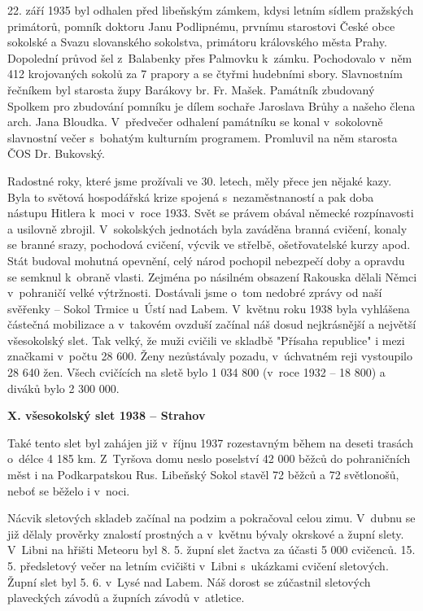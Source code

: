 \documentclass[a5paper, 12pt, twoside]{article}
\begin{document}
22. září 1935 byl odhalen před libeňským zámkem, kdysi letním sídlem
pražských primátorů, pomník doktoru Janu Podlipnému, prvnímu starostovi
České obce sokolské a Svazu slovanského sokolstva, primátoru královského
města Prahy. Dopolední průvod šel z~Balabenky přes Palmovku k~zámku.
Pochodovalo v~něm 412 krojovaných sokolů za 7 prapory a se čtyřmi
hudebními sbory. Slavnostním řečníkem byl starosta župy Barákovy br. Fr.
Mašek. Památník zbudovaný Spolkem pro zbudování pomníku je dílem sochaře
Jaroslava Brůhy a našeho člena arch. Jana Bloudka. V~předvečer odhalení
památníku se konal v~sokolovně slavnostní večer s~bohatým kulturním
programem. Promluvil na něm starosta ČOS Dr. Bukovský.

Radostné roky, které jsme prožívali ve 30. letech, měly přece jen nějaké
kazy. Byla to světová hospodářská krize spojená s~nezaměstnaností a pak
doba nástupu Hitlera k~moci v~roce 1933. Svět se právem obával německé
rozpínavosti a usilovně zbrojil. V~sokolských jednotách byla zaváděna
branná cvičení, konaly se branné srazy, pochodová cvičení, výcvik ve
střelbě, ošetřovatelské kurzy apod. Stát budoval mohutná opevnění, celý
národ pochopil nebezpečí doby a opravdu se semknul k~obraně vlasti.
Zejména po násilném obsazení Rakouska dělali Němci v~pohraničí velké
výtržnosti. Dostávali jsme o~tom nedobré zprávy od naší svěřenky --
Sokol Trmice u~Ústí nad Labem. V~květnu roku 1938 byla vyhlášena
částečná mobilizace a v~takovém ovzduší začínal náš dosud nejkrásnější a
největší všesokolský slet. Tak velký, že muži cvičili ve skladbě
"Přísaha republice" i mezi značkami v~počtu 28 600. Ženy nezůstávaly
pozadu, v~úchvatném reji vystoupilo 28 640 žen. Všech cvičících na sletě
bylo 1 034 800 (v~roce 1932 -- 18 800) a diváků bylo 2 300 000.

\textbf{X. všesokolský slet 1938 -- Strahov}

Také tento slet byl zahájen již v~říjnu 1937 rozestavným během na deseti
trasách o~délce 4 185 km. Z~Tyršova domu neslo poselství 42 000 běžců do
pohraničních měst i na Podkarpatskou Rus. Libeňský Sokol stavěl 72 běžců
a 72 světlonošů, neboť se běželo i v~noci.

Nácvik sletových skladeb začínal na podzim a pokračoval celou zimu.
V~dubnu se již dělaly prověrky znalostí prostných a v~květnu bývaly
okrskové a župní slety. V~Libni na hřišti Meteoru byl 8. 5. župní slet
žactva za účasti 5 000 cvičenců. 15. 5. předsletový večer na letním
cvičišti v~Libni s~ukázkami cvičení sletových. Župní slet byl 5. 6.
v~Lysé nad Labem. Náš dorost se zúčastnil sletových plaveckých závodů a
župních závodů v~atletice.
\end{document}

